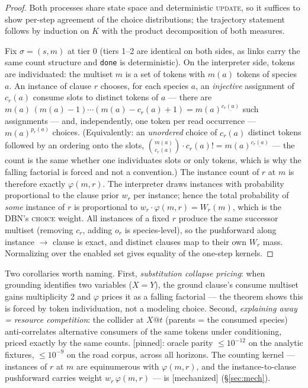 \documentclass[11pt]{article}
\newcommand{\ff}[2]{#1^{\underline{#2}}}          %
\newcommand{\stmech}{[\textsf{mechanized}]}
\newcommand{\stpinned}{[\textsf{pinned}]}
\theoremstyle{plain}
\theoremstyle{definition}
\theoremstyle{remark}
\begin{document}
\begin{proof}
Both processes share state space and deterministic \textsc{update}, so
it suffices to show per-step agreement of the choice distributions; the
trajectory statement follows by induction on $K$ with the product
decomposition of both measures.

Fix $\sigma = (s, m)$ at tier 0 (tiers 1--2 are identical on both sides,
as links carry the same count structure and \texttt{done} is
deterministic). On the interpreter side, tokens are individuated: the
multiset $m$ is a set of tokens with $m(a)$ tokens of species $a$. An
instance of clause $r$ chooses, for each species $a$, an \emph{injective}
assignment of $c_r(a)$ consume slots to distinct tokens of $a$ --- there
are $m(a)\,(m(a)-1)\cdots(m(a)-c_r(a)+1) = \ff{m(a)}{c_r(a)}$ such
assignments --- and, independently, one token per read occurrence ---
$m(a)^{p_r(a)}$ choices. (Equivalently: an \emph{unordered} choice of
$c_r(a)$ distinct tokens followed by an ordering onto the slots,
$\binom{m(a)}{c_r(a)} \cdot c_r(a)! = \ff{m(a)}{c_r(a)}$ --- the count
is the same whether one individuates slots or only tokens, which is why
the falling factorial is forced and not a convention.) The instance
count of $r$ at $m$ is therefore exactly $\varphi(m, r)$. The
interpreter draws instances with probability proportional to the clause
prior $w_r$ per instance; hence the total probability of \emph{some}
instance of $r$ is proportional to $w_r \cdot \varphi(m, r) = W_r(m)$,
which is the DBN's \textsc{choice} weight. All instances of a fixed $r$
produce the same successor multiset (removing $c_r$, adding $o_r$ is
species-level), so the pushforward along instance $\to$ clause is exact,
and distinct clauses map to their own $W_r$ mass. Normalizing over the
enabled set gives equality of the one-step kernels.
\end{proof}

Two corollaries worth naming. First, \emph{substitution collapse
pricing}: when grounding identifies two variables ($X{=}Y$), the ground
clause's consume multiset gains multiplicity 2 and $\varphi$ prices it
as a falling factorial --- the theorem shows this is forced by token
individuation, not a modeling choice. Second, \emph{explaining away =
resource competition}: the collider at $X@t$ (parents = the consumed
species) anti-correlates alternative consumers of the same tokens under
conditioning, priced exactly by the same counts. \stpinned{}: oracle
parity $\le 10^{-12}$ on the analytic fixtures, $\le 10^{-9}$ on the
road corpus, across all horizons. The counting kernel --- instances of
$r$ at $m$ are equinumerous with $\varphi(m,r)$, and the
instance-to-clause pushforward carries weight $w_r\,\varphi(m,r)$ ---
is \stmech{} (\S\ref{sec:mech}).
\end{document}
